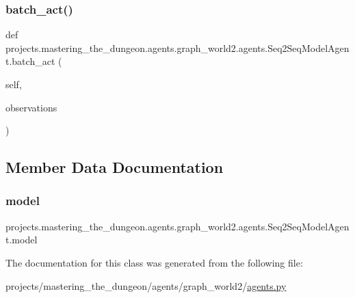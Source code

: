\subsubsection{\texorpdfstring{batch\+\_\+act()}{batch\_act()}}
{\footnotesize\ttfamily def projects.\+mastering\+\_\+the\+\_\+dungeon.\+agents.\+graph\+\_\+world2.\+agents.\+Seq2\+Seq\+Model\+Agent.\+batch\+\_\+act (\begin{DoxyParamCaption}\item[{}]{self,  }\item[{}]{observations }\end{DoxyParamCaption})}



\subsection{Member Data Documentation}
\mbox{\label{classprojects_1_1mastering__the__dungeon_1_1agents_1_1graph__world2_1_1agents_1_1Seq2SeqModelAgent_a97c080f3159cacb53bf3bd35109029d6}} 
\subsubsection{\texorpdfstring{model}{model}}
{\footnotesize\ttfamily projects.\+mastering\+\_\+the\+\_\+dungeon.\+agents.\+graph\+\_\+world2.\+agents.\+Seq2\+Seq\+Model\+Agent.\+model}



The documentation for this class was generated from the following file\+:\begin{DoxyCompactItemize}
\item 
projects/mastering\+\_\+the\+\_\+dungeon/agents/graph\+\_\+world2/\hyperlink{projects_2mastering__the__dungeon_2agents_2graph__world2_2agents_8py}{agents.\+py}\end{DoxyCompactItemize}
